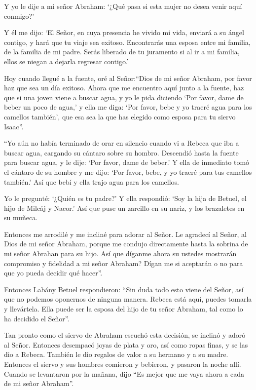  Y yo le dije a mi señor Abraham: `¿Qué pasa si esta mujer
no desea venir aquí conmigo?'

 Y él me dijo: `El Señor, en cuya presencia he vivido mi
vida, enviará a su ángel contigo, y hará que tu viaje sea exitoso.
Encontrarás una esposa entre mi familia, de la familia de mi padre.
 Serás liberado de tu juramento si al ir a mi familia,
ellos se niegan a dejarla regresar contigo.'

 Hoy cuando llegué a la fuente, oré al Señor:``Dios de mi
señor Abraham, por favor haz que sea un día exitoso.  Ahora
que me encuentro aquí junto a la fuente, haz que si una joven viene a
buscar agua, y yo le pida diciendo `Por favor, dame de beber un poco de
agua,'  y ella me diga: `Por favor, bebe y yo traeré agua
para los camellos también', que esa sea la que has elegido como esposa
para tu siervo Isaac''.

 ``Yo aún no había terminado de orar en silencio cuando vi
a Rebeca que iba a buscar agua, cargando su cántaro sobre su hombro.
Descendió hasta la fuente para buscar agua, y le dije: `Por favor, dame
de beber.'  Y ella de inmediato tomó el cántaro de su
hombre y me dijo: `Por favor, bebe, y yo traeré para tus camellos
también.' Así que bebí y ella trajo agua para los camellos.

 Yo le pregunté: `¿Quién es tu padre?' Y ella respondió:
`Soy la hija de Betuel, el hijo de Milcáj y Nacor.' Así que puse un
zarcillo en su nariz, y los brazaletes en su muñeca.

 Entonces me arrodilé y me incliné para adorar al Señor. Le
agradecí al Señor, al Dios de mi señor Abraham, porque me condujo
directamente hasta la sobrina de mi señor Abrahan para su hijo.
 Así que díganme ahora su ustedes mostrarán compromiso y
fidelidad a mi señor Abraham? Dígan me si aceptarán o no para que yo
pueda decidir qué hacer''.

 Entonces Labány Betuel respondieron: ``Sin duda todo esto
viene del Señor, así que no podemos oponernos de ninguna manera.
 Rebeca está aquí, puedes tomarla y llevártela. Ella puede
ser la esposa del hijo de tu señor Abraham, tal como lo ha decidido el
Señor''.

 Tan pronto como el siervo de Abraham escuchó esta
decisión, se inclinó y adoró al Señor.  Entonces desempacó
joyas de plata y oro, así como ropas finas, y se las dio a Rebeca.
También le dio regalos de valor a su hermano y a su madre. 
Entonces el siervo y sus hombres comieron y bebieron, y pasaron la noche
allí. Cuando se levantaron por la mañana, dijo ``Es mejor que me vaya
ahora a cada de mi señor Abraham''.

